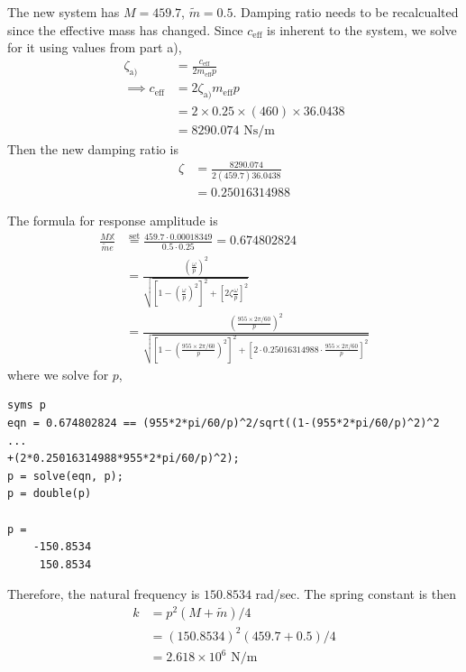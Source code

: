 \subsubsection{}
The new system has $M = 459.7$, $\tilde{m} = 0.5$. Damping ratio needs to be recalcualted since the effective mass has changed. Since $c_{\text{eff}}$ is inherent to the system, we solve for it using values from part a),
\begin{align*}
    \zeta_{\text{a)}} &= \frac{c_{\text{eff}}}{2 m_{\text{eff}} p} \\
    \implies c_{\text{eff}} &= 2 \zeta_{\text{a)}} m_{\text{eff}} p \\
    &= 2 \times 0.25 \times (460) \times 36.0438 \\
    &= 8290.074 \text{ Ns/m}
\end{align*}
Then the new damping ratio is
\begin{align*}
    \zeta &= \frac{8290.074}{2(459.7)36.0438} \\
    &= 0.25016314988
\end{align*}

The formula for response amplitude is 
\begin{align*}
    \frac{M \mathbb{X}}{\tilde{m} e} &\overset{\text{set}}{=} \frac{459.7 \cdot 0.00018349}{0.5 \cdot 0.25} = 0.674802824 \\
    &= \frac{\left(\frac{\omega}{p}\right)^2}{\sqrt{\left[1 - \left(\frac{\omega}{p}\right)^2\right]^2 + \left[2 \zeta \frac{\omega}{p}\right]^2}} \\
    &= \frac{\left(\frac{955 \times 2\pi/60}{p}\right)^2}{\sqrt{\left[1 - \left(\frac{955 \times 2\pi/60}{p}\right)^2\right]^2 + \left[2 \cdot 0.25016314988 \cdot \frac{955 \times 2\pi/60}{p}\right]^2}}
\end{align*}
where we solve for $p$,
\begin{verbatim}
syms p
eqn = 0.674802824 == (955*2*pi/60/p)^2/sqrt((1-(955*2*pi/60/p)^2)^2 ...
+(2*0.25016314988*955*2*pi/60/p)^2);
p = solve(eqn, p);
p = double(p)

p =
    -150.8534
     150.8534 
\end{verbatim}
Therefore, the natural frequency is $150.8534$ rad/sec. The spring constant is then
\begin{align*}
    k &= p^2(M+ \tilde{m})/4 \\
    &= (150.8534)^2(459.7 + 0.5)/4 \\
    &= \boxed{2.618 \times 10^6 \text{ N/m}}
\end{align*}